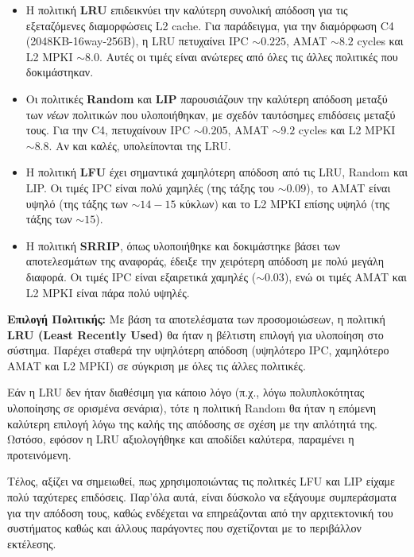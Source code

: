 \documentclass{article}
\begin{document}
\begin{itemize}
    \item Η πολιτική \textbf{LRU} επιδεικνύει την καλύτερη συνολική απόδοση για τις εξεταζόμενες διαμορφώσεις L2 cache. Για παράδειγμα, για την διαμόρφωση C4 (2048KB-16way-256B), η LRU πετυχαίνει IPC $\sim 0.225$, AMAT $\sim 8.2$ cycles και L2 MPKI $\sim 8.0$. Αυτές οι τιμές είναι ανώτερες από όλες τις άλλες πολιτικές που δοκιμάστηκαν.
    \item Οι πολιτικές \textbf{Random} και \textbf{LIP} παρουσιάζουν την καλύτερη απόδοση μεταξύ των \textit{νέων} πολιτικών που υλοποιήθηκαν, με σχεδόν ταυτόσημες επιδόσεις μεταξύ τους. Για την C4, πετυχαίνουν IPC $\sim 0.205$, AMAT $\sim 9.2$ cycles και L2 MPKI $\sim 8.8$. Αν και καλές, υπολείπονται της LRU.
    \item Η πολιτική \textbf{LFU} έχει σημαντικά χαμηλότερη απόδοση από τις LRU, Random και LIP. Οι τιμές IPC είναι πολύ χαμηλές (της τάξης του $\sim 0.09$), το AMAT είναι υψηλό (της τάξης των $\sim 14-15$ κύκλων) και το L2 MPKI επίσης υψηλό (της τάξης των $\sim 15$).
    \item Η πολιτική \textbf{SRRIP}, όπως υλοποιήθηκε και δοκιμάστηκε βάσει των αποτελεσμάτων της αναφοράς, έδειξε την χειρότερη απόδοση με πολύ μεγάλη διαφορά. Οι τιμές IPC είναι εξαιρετικά χαμηλές ($\sim 0.03$), ενώ οι τιμές AMAT και L2 MPKI είναι πάρα πολύ υψηλές.
\end{itemize}

\textbf{Επιλογή Πολιτικής:}
Με βάση τα αποτελέσματα των προσομοιώσεων, η πολιτική \textbf{LRU (Least Recently Used)} θα ήταν η βέλτιστη επιλογή για υλοποίηση στο σύστημα. 
Παρέχει σταθερά την υψηλότερη απόδοση (υψηλότερο IPC, χαμηλότερο AMAT και L2 MPKI) σε σύγκριση με όλες τις άλλες πολιτικές.

Εάν η LRU δεν ήταν διαθέσιμη για κάποιο λόγο (π.χ., λόγω πολυπλοκότητας υλοποίησης σε ορισμένα σενάρια), τότε η πολιτική Random θα ήταν η επόμενη καλύτερη επιλογή λόγω της καλής της απόδοσης σε σχέση με την απλότητά της. 
Ωστόσο, εφόσον η LRU αξιολογήθηκε και αποδίδει καλύτερα, παραμένει η προτεινόμενη.

Τέλος, αξίζει να σημειωθεί, πως χρησιμοποιώντας τις πολιτκές LFU και LIP είχαμε πολύ ταχύτερες επιδόσεις.
Παρ'όλα αυτά, είναι δύσκολο να εξάγουμε συμπεράσματα για την απόδοση τους, καθώς ενδέχεται να επηρεάζονται από την αρχιτεκτονική του συστήματος καθώς και άλλους παράγοντες που σχετίζονται με το περιβάλλον εκτέλεσης.
\end{document}
